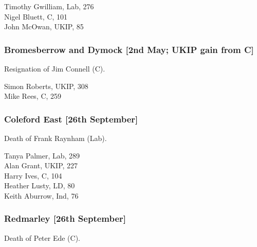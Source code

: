 \documentclass[a4paper,openany,10pt]{book}
\begin{document}
Timothy Gwilliam, Lab, 276\\
Nigel Bluett, C, 101\\
John McOwan, UKIP, 85\\


\subsubsection*{Bromesberrow and Dymock \hspace*{\fill}\nolinebreak[1]%
\enspace\hspace*{\fill}
[2nd May; UKIP gain from C]}


Resignation of Jim Connell (C).



Simon Roberts, UKIP, 308\\
Mike Rees, C, 259\\


\subsubsection*{Coleford East \hspace*{\fill}\nolinebreak[1]%
\enspace\hspace*{\fill}
[26th September]}


Death of Frank Raynham (Lab).



Tanya Palmer, Lab, 289\\
Alan Grant, UKIP, 227\\
Harry Ives, C, 104\\
Heather Lusty, LD, 80\\
Keith Aburrow, Ind, 76\\


\subsubsection*{Redmarley \hspace*{\fill}\nolinebreak[1]%
\enspace\hspace*{\fill}
[26th September]}


Death of Peter Ede (C).
\end{document}
